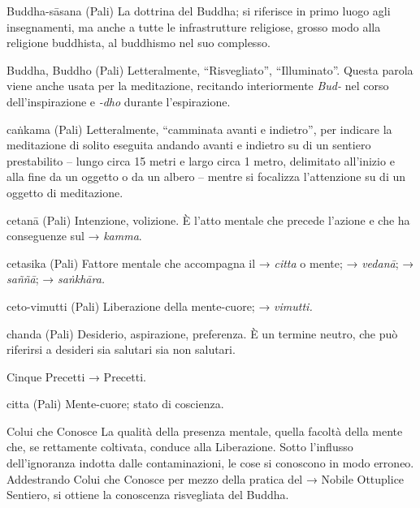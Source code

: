 \begin{glossarydescription}
\item[Buddha-sāsana] (Pali) La dottrina del Buddha; si riferisce in primo
luogo agli insegnamenti, ma anche a tutte le infrastrutture religiose,
grosso modo alla religione buddhista, al buddhismo nel suo complesso.

\item[Buddha, Buddho] (Pali) Letteralmente, ``Risvegliato'', ``Illuminato''.
Questa parola viene anche usata per la meditazione, recitando
interiormente \emph{Bud-} nel corso dell'inspirazione e \emph{-dho}
durante l'espirazione.


\item[caṅkama] (Pali) Letteralmente, ``camminata avanti e indietro'', per
indicare la meditazione di solito eseguita andando avanti e indietro su
di un sentiero prestabilito -- lungo circa 15 metri e largo circa 1
metro, delimitato all'inizio e alla fine da un oggetto o da un albero --
mentre si focalizza l'attenzione su di un oggetto di meditazione.

\item[cetanā] (Pali) Intenzione, volizione. È l'atto mentale che precede
l'azione e che ha conseguenze sul → \emph{kamma}.

\item[cetasika] (Pali) Fattore mentale che accompagna il → \emph{citta} o
mente; → \emph{vedanā}; → \emph{saññā}; → \emph{saṅkhāra.}

\item[ceto-vimutti] (Pali) Liberazione della mente-cuore; → \emph{vimutti.}

\item[chanda] (Pali) Desiderio, aspirazione, preferenza. È un termine neutro,
che può riferirsi a desideri sia salutari sia non salutari.

\item[Cinque Precetti] → Precetti.

\item[citta] (Pali) Mente-cuore; stato di coscienza.

\item[Colui che Conosce] La qualità della presenza mentale, quella facoltà
della mente che, se rettamente coltivata, conduce alla Liberazione.
Sotto l'influsso dell'ignoranza indotta dalle contaminazioni, le cose si
conoscono in modo erroneo. Addestrando Colui che Conosce per mezzo della
pratica del → Nobile Ottuplice Sentiero, si ottiene la conoscenza
risvegliata del Buddha.



\end{glossarydescription}
